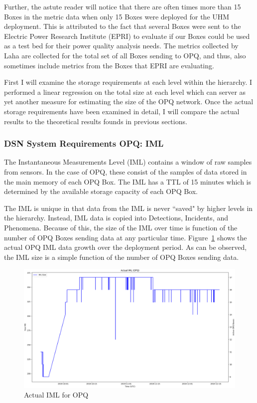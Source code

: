 Further, the astute reader will notice that there are often times more than 15 Boxes in the metric data when only 15 Boxes were deployed for the UHM deployment. This is attributed to the fact that several Boxes were sent to the Electric Power Research Institute (EPRI) to evaluate if our Boxes could be used as a test bed for their power quality analysis needs. The metrics collected by Laha are collected for the total set of all Boxes sending to OPQ, and thus, also sometimes include metrics from the Boxes that EPRI are evaluating.

First I will examine the storage requirements at each level within the hierarchy. I performed a linear regression on the total size at each level which can server as yet another measure for estimating the size of the OPQ network. Once the actual storage requirements have been examined in detail, I will compare the actual results to the theoretical results founds in previous sections.

\subsubsection{DSN System Requirements OPQ: IML}

The Instantaneous Measurements Level (IML) contains a window of raw samples from sensors. In the case of OPQ, these consist of the samples of data stored in the main memory of each OPQ Box. The IML has a TTL of 15 minutes which is determined by the available storage capacity of each OPQ Box.

The IML is unique in that data from the IML is never ``saved" by higher levels in the hierarchy. Instead, IML data is copied into Detections, Incidents, and Phenomena. Because of this, the size of the IML over time is function of the number of OPQ Boxes sending data at any particular time. Figure~\ref{fig:actual_iml_opq} shows the actual OPQ IML data growth over the deployment period. As can be observed, the IML size is a simple function of the number of OPQ Boxes sending data.

\begin{figure}[H]
    \centering
    \includegraphics[width=\linewidth]{figures/actual_iml_opq.png}
    \caption{Actual IML for OPQ}
    \label{fig:actual_iml_opq}
\end{figure}


